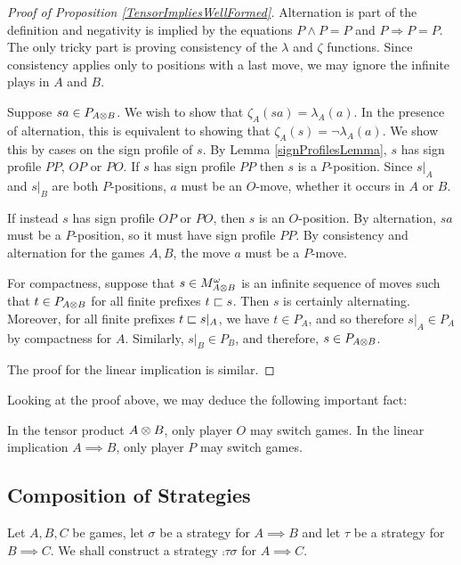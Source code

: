 \documentclass{article}
\begin{document}
\begin{proof}[Proof of Proposition \ref{TensorImpliesWellFormed}]
  Alternation is part of the definition and negativity is implied by the equations $P\wedge P = P$ and $P\Rightarrow P = P$.  The only tricky part is proving consistency of the $\lambda$ and $\zeta$ functions.  Since consistency applies only to positions with a last move, we may ignore the infinite plays in $A$ and $B$.  

  Suppose $sa\in P_{A\otimes B}$.  We wish to show that $\zeta_{A}(sa)=\lambda_A(a)$.  In the presence of alternation, this is equivalent to showing that $\zeta_A(s) = \neg \lambda_A(a)$.  We show this by cases on the sign profile of $s$.  By Lemma \ref{signProfilesLemma}, $s$ has sign profile $PP$, $OP$ or $PO$.  If $s$ has sign profile $PP$ then $s$ is a $P$-position.  Since $s\vert_A$ and $s\vert_B$ are both $P$-positions, $a$ must be an $O$-move, whether it occurs in $A$ or $B$.  

  If instead $s$ has sign profile $OP$ or $PO$, then $s$ is an $O$-position.  By alternation, $sa$ must be a $P$-position, so it must have sign profile $PP$.  By consistency and alternation for the games $A,B$, the move $a$ must be a $P$-move.  

  For compactness, suppose that $s\in M_{A\otimes B}^\omega$ is an infinite sequence of moves such that $t\in P_{A\otimes B}$ for all finite prefixes $t\sqsubset s$.  Then $s$ is certainly alternating.  Moreover, for all finite prefixes $t\sqsubset s\vert_A$, we have $t\in P_A$, and so therefore $s\vert_A\in P_A$ by compactness for $A$.  Similarly, $s\vert_B\in P_B$, and therefore, $s\in P_{A\otimes B}$.

  The proof for the linear implication is similar.
\end{proof}

Looking at the proof above, we may deduce the following important fact:

\begin{proposition}
  In the tensor product $A\otimes B$, only player $O$ may switch games.  In the linear implication $A\implies B$, only player $P$ may switch games.
\end{proposition}

\subsection{Composition of Strategies}

Let $A,B,C$ be games, let $\sigma$ be a strategy for $A\implies B$ and let $\tau$ be a strategy for $B\implies C$.  We shall construct a strategy $\comp\tau\sigma$ for $A\implies C$.  
\end{document}

